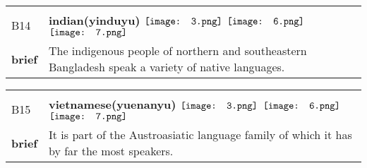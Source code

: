 \documentclass[UTF8]{article}
\begin{document}
            \begin{tabularx}{\textwidth}{p{1.5cm}X}
            \arrayrulecolor{myBlue}
        	\hline\\
            \small{B14}&
            \large{\bfseries{indian(yinduyu)}}\hfill
                                                            \phantom{$\vcenter{\hbox{\texttt{[image: 1.png]}}}$}
                                                                \phantom{$\vcenter{\hbox{\texttt{[image: 2.png]}}}$}
                                                                $\vcenter{\hbox{\texttt{[image: 3.png]}}}$
                                                                \phantom{$\vcenter{\hbox{\texttt{[image: 4.png]}}}$}
                                                                \phantom{$\vcenter{\hbox{\texttt{[image: 5.png]}}}$}
                                                                $\vcenter{\hbox{\texttt{[image: 6.png]}}}$
                                                                $\vcenter{\hbox{\texttt{[image: 7.png]}}}$
                                        \\[10pt]
            \large{\bfseries{brief}}&\noindent\parbox[c]{\hsize}{The indigenous people of northern and southeastern Bangladesh speak a variety of native languages.} \\[5pt]
            \hline\\[-10pt]
        \end{tabularx}
            \begin{tabularx}{\textwidth}{p{1.5cm}X}
            \arrayrulecolor{myBlue}
        	\hline\\
            \small{B15}&
            \large{\bfseries{vietnamese(yuenanyu)}}\hfill
                                                            \phantom{$\vcenter{\hbox{\texttt{[image: 1.png]}}}$}
                                                                \phantom{$\vcenter{\hbox{\texttt{[image: 2.png]}}}$}
                                                                $\vcenter{\hbox{\texttt{[image: 3.png]}}}$
                                                                \phantom{$\vcenter{\hbox{\texttt{[image: 4.png]}}}$}
                                                                \phantom{$\vcenter{\hbox{\texttt{[image: 5.png]}}}$}
                                                                $\vcenter{\hbox{\texttt{[image: 6.png]}}}$
                                                                $\vcenter{\hbox{\texttt{[image: 7.png]}}}$
                                        \\[10pt]
            \large{\bfseries{brief}}&\noindent\parbox[c]{\hsize}{It is part of the Austroasiatic language family of which it has by far the most speakers.} \\[5pt]
            \hline\\[-10pt]
        \end{tabularx}
\end{document}
